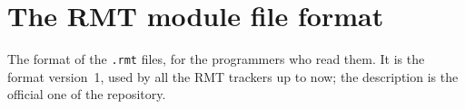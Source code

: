 \chapter{The RMT module file format}\label{app:format}

The format of the \texttt{.rmt} files, for the programmers who read them. It is the format version~1, used by all the RMT trackers up to
now; the description is the official one of the repository.



